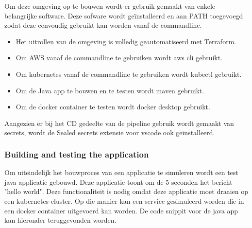 Om deze omgeving op te bouwen wordt er gebruik gemaakt van enkele belangrijke software. Deze sofware wordt geïnstalleerd en aan PATH toegevoegd zodat deze eenvoudig gebruikt kan worden vanaf de commandline.

\begin{itemize}
  \item Het uitrollen van de omgeving is volledig geautomatiseerd met Terraform.
  \item Om AWS vanaf de commandline te gebruiken wordt aws cli gebruikt.
  \item Om kubernetes vanaf de commandline te gebruiken wordt kubectl gebruikt.
  \item Om de Java app te bouwen en te testen wordt maven gebruikt.
  \item Om de docker container te testen wordt docker desktop gebruikt.
\end{itemize}

Aangezien er bij het CD gedeelte van de pipeline gebruik wordt gemaakt van secrets, wordt de Sealed secrets extensie voor vscode ook geïnstalleerd.

\subsubsection{
{Building and testing the application}}
\label{sec:Bouwen en testen van de applicatie}

Om uiteindelijk het bouwproces van een applicatie te simuleren wordt een test java applicatie gebouwd. Deze applicatie toont om de 5 seconden het bericht "hello world". Deze functionaliteit is nodig omdat deze applicatie moet draaien op een kubernetes cluster. Op die manier kan een service gesimuleerd worden die in een docker container uitgevoerd kan worden. De code snippit voor de java app kan hieronder teruggevonden worden.
\newline

